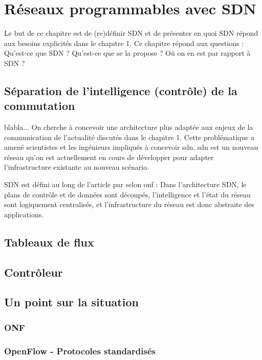 \chapter{Réseaux programmables avec SDN}

Le but de ce chapitre est de (re)définir SDN et de présenter en quoi SDN répond aux besoins explicités dans le chapitre 1.
Ce chapitre répond aux questions : Qu'est-ce que SDN ? Qu'est-ce que se la propose ? Où on en est par rapport à SDN ?

\section{Séparation de l'intelligence (contrôle) de la commutation}

blabla...
On cherche à concevoir une architecture plus adaptée aux enjeux de la communication de l'actualité discutés dans le chapitre 1. Cette problématique a amené scientistes et les ingénieurs impliqués à concevoir \gls{sdn}. \gls{sdn} est un nouveau  réseau qu'on est actuellement en cours de développer pour adapter l'infrastructure existante au nouveau scénario.



SDN est défini au long de l'article par  selon \gls{onf} \cite{SDNNewNormONFExecutiveSummary} : Dans l'architecture SDN, le plans de contrôle et de données sont découpés, l'intelligence et l'état du réseau sont logiquement centralisés, et l'infrastructure du réseau est donc abstraite des applications. 




\section{Tableaux de flux}

\section{Contrôleur}

\section{Un point sur la situation}
\subsection{ONF}

\subsection{OpenFlow - Protocoles standardisés}
